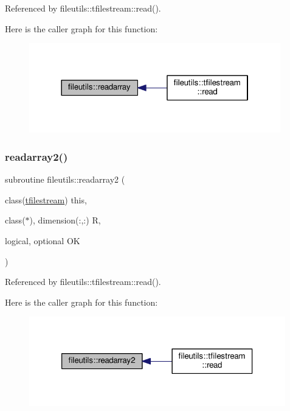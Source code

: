 Referenced by fileutils\+::tfilestream\+::read().

Here is the caller graph for this function\+:
\nopagebreak
\begin{figure}[H]
\begin{center}
\leavevmode
\includegraphics[width=310pt]{namespacefileutils_a77d1826f1c337fc426cfbc7a8d2b642a_icgraph}
\end{center}
\end{figure}
\mbox{\label{namespacefileutils_a1decdb16477082bdf6b48d9feb1accf7}} 
\subsubsection{\texorpdfstring{readarray2()}{readarray2()}}
{\footnotesize\ttfamily subroutine fileutils\+::readarray2 (\begin{DoxyParamCaption}\item[{class(\mbox{\hyperlink{structfileutils_1_1tfilestream}{tfilestream}})}]{this,  }\item[{class($\ast$), dimension(\+:,\+:)}]{R,  }\item[{logical, optional}]{OK }\end{DoxyParamCaption})\hspace{0.3cm}{\ttfamily [private]}}



Referenced by fileutils\+::tfilestream\+::read().

Here is the caller graph for this function\+:
\nopagebreak
\begin{figure}[H]
\begin{center}
\leavevmode
\includegraphics[width=316pt]{namespacefileutils_a1decdb16477082bdf6b48d9feb1accf7_icgraph}
\end{center}
\end{figure}
\mbox{\label{namespacefileutils_abe905cf8167e2a6f36f2ddfcec24b6ad}} 
